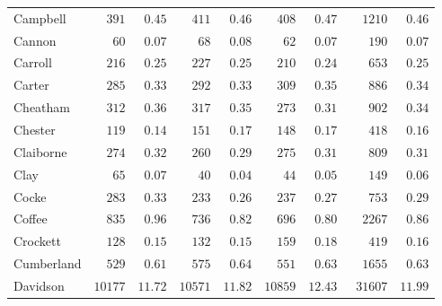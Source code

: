 \documentclass[9pt, oneside]{article}   	%
\begin{document}
\begin{longtable}{lcccccccc}
Campbell  & $\phantom{00}391$ & $\phantom{0}0.45$ & $\phantom{00}411$ & $\phantom{0}0.46$ & $\phantom{00}408$ & $\phantom{0}0.47$ & $\phantom{00}1210$ & $\phantom{0}0.46$ \\
Cannon  & $\phantom{000}60$ & $\phantom{0}0.07$ & $\phantom{000}68$ & $\phantom{0}0.08$ & $\phantom{000}62$ & $\phantom{0}0.07$ & $\phantom{000}190$ & $\phantom{0}0.07$ \\
Carroll  & $\phantom{00}216$ & $\phantom{0}0.25$ & $\phantom{00}227$ & $\phantom{0}0.25$ & $\phantom{00}210$ & $\phantom{0}0.24$ & $\phantom{000}653$ & $\phantom{0}0.25$ \\
Carter  & $\phantom{00}285$ & $\phantom{0}0.33$ & $\phantom{00}292$ & $\phantom{0}0.33$ & $\phantom{00}309$ & $\phantom{0}0.35$ & $\phantom{000}886$ & $\phantom{0}0.34$ \\
Cheatham  & $\phantom{00}312$ & $\phantom{0}0.36$ & $\phantom{00}317$ & $\phantom{0}0.35$ & $\phantom{00}273$ & $\phantom{0}0.31$ & $\phantom{000}902$ & $\phantom{0}0.34$ \\
Chester  & $\phantom{00}119$ & $\phantom{0}0.14$ & $\phantom{00}151$ & $\phantom{0}0.17$ & $\phantom{00}148$ & $\phantom{0}0.17$ & $\phantom{000}418$ & $\phantom{0}0.16$ \\
Claiborne  & $\phantom{00}274$ & $\phantom{0}0.32$ & $\phantom{00}260$ & $\phantom{0}0.29$ & $\phantom{00}275$ & $\phantom{0}0.31$ & $\phantom{000}809$ & $\phantom{0}0.31$ \\
Clay  & $\phantom{000}65$ & $\phantom{0}0.07$ & $\phantom{000}40$ & $\phantom{0}0.04$ & $\phantom{000}44$ & $\phantom{0}0.05$ & $\phantom{000}149$ & $\phantom{0}0.06$ \\
Cocke  & $\phantom{00}283$ & $\phantom{0}0.33$ & $\phantom{00}233$ & $\phantom{0}0.26$ & $\phantom{00}237$ & $\phantom{0}0.27$ & $\phantom{000}753$ & $\phantom{0}0.29$ \\
Coffee  & $\phantom{00}835$ & $\phantom{0}0.96$ & $\phantom{00}736$ & $\phantom{0}0.82$ & $\phantom{00}696$ & $\phantom{0}0.80$ & $\phantom{00}2267$ & $\phantom{0}0.86$ \\
Crockett  & $\phantom{00}128$ & $\phantom{0}0.15$ & $\phantom{00}132$ & $\phantom{0}0.15$ & $\phantom{00}159$ & $\phantom{0}0.18$ & $\phantom{000}419$ & $\phantom{0}0.16$ \\
Cumberland  & $\phantom{00}529$ & $\phantom{0}0.61$ & $\phantom{00}575$ & $\phantom{0}0.64$ & $\phantom{00}551$ & $\phantom{0}0.63$ & $\phantom{00}1655$ & $\phantom{0}0.63$ \\
Davidson  & $10177$ & $11.72$ & $10571$ & $11.82$ & $10859$ & $12.43$ & $\phantom{0}31607$ & $11.99$ \\

\end{longtable}
\end{document}
